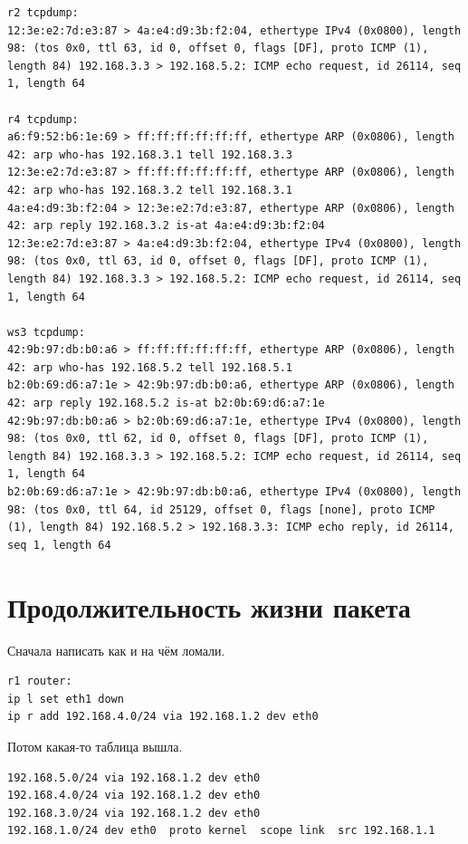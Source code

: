 \documentclass[a4paper,12pt]{article}
\begin{document}
\begin{Verbatim}
r2 tcpdump:
12:3e:e2:7d:e3:87 > 4a:e4:d9:3b:f2:04, ethertype IPv4 (0x0800), length 98: (tos 0x0, ttl 63, id 0, offset 0, flags [DF], proto ICMP (1), length 84) 192.168.3.3 > 192.168.5.2: ICMP echo request, id 26114, seq 1, length 64

r4 tcpdump:
a6:f9:52:b6:1e:69 > ff:ff:ff:ff:ff:ff, ethertype ARP (0x0806), length 42: arp who-has 192.168.3.1 tell 192.168.3.3
12:3e:e2:7d:e3:87 > ff:ff:ff:ff:ff:ff, ethertype ARP (0x0806), length 42: arp who-has 192.168.3.2 tell 192.168.3.1
4a:e4:d9:3b:f2:04 > 12:3e:e2:7d:e3:87, ethertype ARP (0x0806), length 42: arp reply 192.168.3.2 is-at 4a:e4:d9:3b:f2:04
12:3e:e2:7d:e3:87 > 4a:e4:d9:3b:f2:04, ethertype IPv4 (0x0800), length 98: (tos 0x0, ttl 63, id 0, offset 0, flags [DF], proto ICMP (1), length 84) 192.168.3.3 > 192.168.5.2: ICMP echo request, id 26114, seq 1, length 64

ws3 tcpdump:
42:9b:97:db:b0:a6 > ff:ff:ff:ff:ff:ff, ethertype ARP (0x0806), length 42: arp who-has 192.168.5.2 tell 192.168.5.1
b2:0b:69:d6:a7:1e > 42:9b:97:db:b0:a6, ethertype ARP (0x0806), length 42: arp reply 192.168.5.2 is-at b2:0b:69:d6:a7:1e
42:9b:97:db:b0:a6 > b2:0b:69:d6:a7:1e, ethertype IPv4 (0x0800), length 98: (tos 0x0, ttl 62, id 0, offset 0, flags [DF], proto ICMP (1), length 84) 192.168.3.3 > 192.168.5.2: ICMP echo request, id 26114, seq 1, length 64
b2:0b:69:d6:a7:1e > 42:9b:97:db:b0:a6, ethertype IPv4 (0x0800), length 98: (tos 0x0, ttl 64, id 25129, offset 0, flags [none], proto ICMP (1), length 84) 192.168.5.2 > 192.168.3.3: ICMP echo reply, id 26114, seq 1, length 64
\end{Verbatim}

\section{Продолжительность жизни пакета}

Сначала написать как и на чём ломали. 

\begin{Verbatim}
r1 router:
ip l set eth1 down
ip r add 192.168.4.0/24 via 192.168.1.2 dev eth0
\end{Verbatim}

Потом какая-то таблица вышла.

\begin{Verbatim}
192.168.5.0/24 via 192.168.1.2 dev eth0 
192.168.4.0/24 via 192.168.1.2 dev eth0 
192.168.3.0/24 via 192.168.1.2 dev eth0 
192.168.1.0/24 dev eth0  proto kernel  scope link  src 192.168.1.1
\end{Verbatim}
\end{document}
